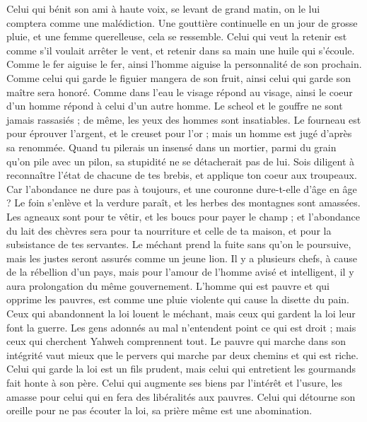 \begin{multicols}{2}
Celui qui bénit son ami à haute voix, se levant de grand matin, on le lui comptera comme une malédiction.
Une gouttière continuelle en un jour de grosse pluie, et une femme querelleuse, cela se ressemble.
Celui qui veut la retenir est comme s’il voulait arrêter le vent, et retenir dans sa main une huile qui s’écoule.
Comme le fer aiguise le fer, ainsi l'homme aiguise la personnalité de son prochain.
Comme celui qui garde le figuier  mangera de son fruit, ainsi celui qui garde son maître sera honoré.
Comme dans l'eau le visage répond au visage, ainsi le coeur d'un homme répond à celui d'un autre homme.
Le scheol et le gouffre ne sont jamais rassasiés ; de même, les yeux des hommes sont insatiables.
Le fourneau est pour éprouver l'argent, et le creuset pour l'or ; mais un homme est jugé d’après sa renommée.
Quand tu pilerais un insensé dans un mortier, parmi du grain qu'on pile avec un pilon, sa stupidité ne se détacherait pas de lui.
Sois diligent à reconnaître l'état de chacune de tes brebis, et applique ton coeur aux troupeaux.
Car l’abondance ne dure pas à toujours, et une couronne  dure-t-elle d'âge en âge ?
Le foin s’enlève et la verdure paraît, et les herbes des montagnes sont amassées.
Les agneaux sont pour te vêtir, et les boucs pour payer le champ ;
et l'abondance du lait des chèvres sera pour ta nourriture et celle de ta maison, et pour la subsistance de tes servantes.
\VerseOne{}Le méchant prend la fuite sans qu'on le poursuive, mais les justes seront assurés comme un jeune lion.
Il y a plusieurs chefs, à cause de la rébellion d’un pays, mais pour l'amour de l'homme avisé et intelligent, il y aura prolongation du même gouvernement.
L'homme qui est pauvre et qui opprime les pauvres, est comme une pluie violente qui cause la disette du pain.
Ceux qui abandonnent la loi louent le méchant, mais ceux qui gardent la loi leur font la guerre.
Les gens adonnés au mal n'entendent point ce qui est droit ; mais ceux qui cherchent Yahweh comprennent tout.
Le pauvre qui marche dans son intégrité vaut mieux que le pervers qui marche par deux chemins et qui est riche.
Celui qui garde la loi est un fils prudent, mais celui qui entretient les gourmands fait honte à son père.
Celui qui augmente ses biens par l’intérêt et l’usure, les amasse pour celui qui en fera des libéralités aux pauvres.
Celui qui détourne son oreille pour ne pas écouter la loi, sa prière même est une abomination.

\end{multicols}
